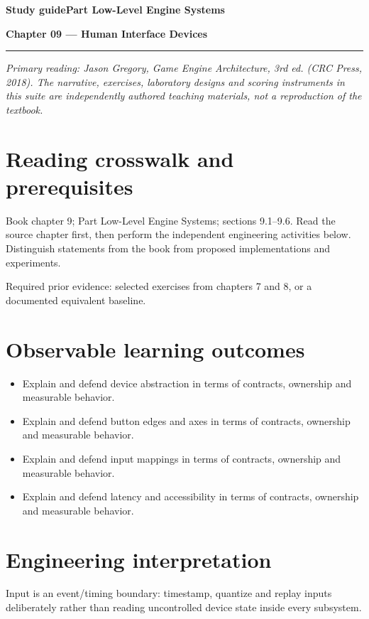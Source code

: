 \documentclass[11pt,letterpaper]{article}
\newcommand{\DocType}{Reference}
\newcommand{\SuiteHeading}[3]{%
\renewcommand{\DocType}{#2}%
{\small\bfseries\sffamily\color{EngineTeal}#2\hfill #3}\par\vspace{6pt}
{\LARGE\bfseries\color{EngineBlue}#1}\par\vspace{4pt}
{\color{EngineTeal}\rule{\linewidth}{1pt}}\par\vspace{7pt}}
\newcommand{\SourceNote}{\footnotesize\textit{Primary reading: Jason Gregory, \emph{Game Engine Architecture}, 3rd ed. (CRC Press, 2018). The narrative, exercises, laboratory designs and scoring instruments in this suite are independently authored teaching materials, not a reproduction of the textbook.}\normalsize\par}
\begin{document}
\SuiteHeading{Chapter 09 — Human Interface Devices}{Study guide}{Part Low-Level Engine Systems}
\SourceNote
\section{Reading crosswalk and prerequisites}
Book chapter 9; Part Low-Level Engine Systems; sections 9.1--9.6. Read the source chapter first, then perform the independent engineering activities below. Distinguish statements from the book from proposed implementations and experiments.

Required prior evidence: selected exercises from chapters 7 and 8, or a documented equivalent baseline.

\section{Observable learning outcomes}
\begin{itemize}
\item Explain and defend device abstraction in terms of contracts, ownership and measurable behavior.
\item Explain and defend button edges and axes in terms of contracts, ownership and measurable behavior.
\item Explain and defend input mappings in terms of contracts, ownership and measurable behavior.
\item Explain and defend latency and accessibility in terms of contracts, ownership and measurable behavior.
\end{itemize}
\section{Engineering interpretation}
Input is an event/timing boundary: timestamp, quantize and replay inputs deliberately rather than reading uncontrolled device state inside every subsystem.
\end{document}
